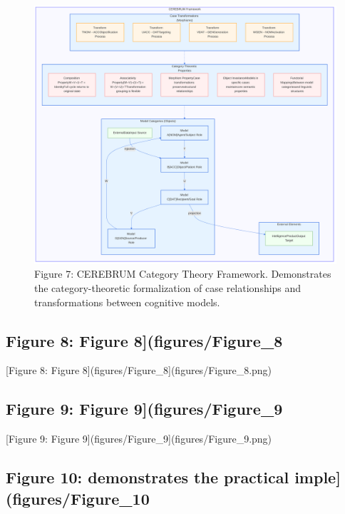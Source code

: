 \documentclass[
  11pt,
  letterpaper,
]{article}
\begin{document}
\begin{figure}
\centering
\includegraphics{figures/Figure_7.png}
\caption{Figure 7: CEREBRUM Category Theory Framework. Demonstrates the
category-theoretic formalization of case relationships and
transformations between cognitive models.}
\end{figure}

\pagebreak

\hypertarget{figure-8-figure-8figuresfigure_8}{%
\subsection{Figure 8: Figure
8{]}(figures/Figure\_8}\label{figure-8-figure-8figuresfigure_8}}

{[}Figure 8: Figure 8{]}(figures/Figure\_8{]}(figures/Figure\_8.png)

\pagebreak

\hypertarget{figure-9-figure-9figuresfigure_9}{%
\subsection{Figure 9: Figure
9{]}(figures/Figure\_9}\label{figure-9-figure-9figuresfigure_9}}

{[}Figure 9: Figure 9{]}(figures/Figure\_9{]}(figures/Figure\_9.png)

\pagebreak

\hypertarget{figure-10-demonstrates-the-practical-implefiguresfigure_10}{%
\subsection{Figure 10: demonstrates the practical
imple{]}(figures/Figure\_10}\label{figure-10-demonstrates-the-practical-implefiguresfigure_10}}
\end{document}
